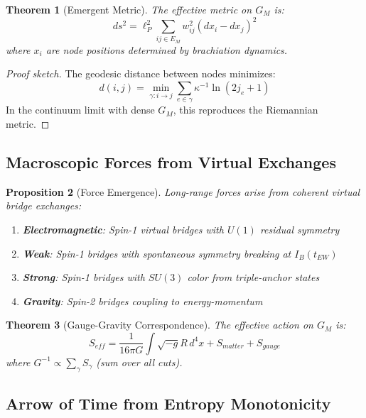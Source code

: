 \documentclass[11pt]{article}
\theoremstyle{plain}
\newtheorem{theorem}{Theorem}[section]
\newtheorem{proposition}[theorem]{Proposition}
\theoremstyle{definition}
\begin{document}
\begin{theorem}[Emergent Metric]
  The effective metric on $G_M$ is:
  \begin{equation}
    ds^2 = \ell_P^2 \sum_{ij \in E_M} w_{ij}^2 (dx_i - dx_j)^2
  \end{equation}
  where $x_i$ are node positions determined by brachiation dynamics.
\end{theorem}

\begin{proof}[Proof sketch]
  The geodesic distance between nodes minimizes:
  \begin{equation}
    d(i,j) = \min_{\gamma: i \to j} \sum_{e \in \gamma} \kappa^{-1} \ln(2j_e + 1)
  \end{equation}
  In the continuum limit with dense $G_M$, this reproduces the Riemannian metric.
\end{proof}

\subsection{Macroscopic Forces from Virtual Exchanges}

\begin{proposition}[Force Emergence]
  Long-range forces arise from coherent virtual bridge exchanges:
  \begin{enumerate}
    \item \textbf{Electromagnetic}: Spin-1 virtual bridges with $U(1)$ residual symmetry
    \item \textbf{Weak}: Spin-1 bridges with spontaneous symmetry breaking at $I_B(t_{EW})$
    \item \textbf{Strong}: Spin-1 bridges with $SU(3)$ color from triple-anchor states
    \item \textbf{Gravity}: Spin-2 bridges coupling to energy-momentum
  \end{enumerate}
\end{proposition}

\begin{theorem}[Gauge-Gravity Correspondence]
  The effective action on $G_M$ is:
  \begin{equation}
    S_{eff} = \frac{1}{16\pi G} \int \sqrt{-g} R \, d^4x + S_{matter} + S_{gauge}
  \end{equation}
  where $G^{-1} \propto \sum_{\gamma} S_\gamma$ (sum over all cuts).
\end{theorem}

\subsection{Arrow of Time from Entropy Monotonicity}
\end{document}
